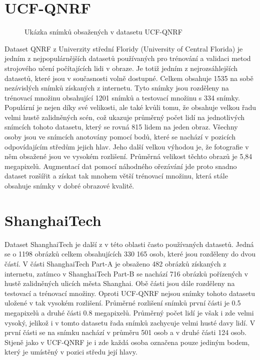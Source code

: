 \section{UCF-QNRF}
\begin{figure}[h!]
	\centering
	\caption{Ukázka snímků obsažených v datasetu UCF-QNRF \cite{QNRF}}
	\label{fig:QNRF}
\end{figure}

Dataset QNRF \cite{QNRF} z Univerzity střední Floridy (University of Central Florida) je jedním z nejpopulárnějších datasetů používaných pro trénování a validaci metod strojového učení počítajících lidi v obraze.
Je totiž jedním z nejrozsáhlejších datasetů, které jsou v současnosti volně dostupné.
Celkem obsahuje 1535 na sobě nezávislých snímků získaných z internetu.
Tyto snímky jsou rozděleny na trénovací množinu obsahující 1201 snímků a testovací množinu s 334 snímky.
Populární je nejen díky své velikosti, ale také kvůli tomu, že obsahuje velkou řadu velmi hustě zalidněných scén, což ukazuje průměrný počet lidí na jednotlivých snímcích tohoto datasetu, který se rovná 815 lidem na jeden obraz.
Všechny osoby jsou ve snímcích anotovány pomocí bodů, které se nachází v pozicích odpovídajícím středům jejich hlav.
Jeho další velkou výhodou je, že fotografie v něm obsažené jsou ve vysokém rozlišení.
Průměrná velikost těchto obrazů je 5,84 megapixelů.
Augmentací dat pomocí náhodného ořezávání jde proto snadno dataset rozšířit a získat tak mnohem větší trénovací množinu, která stále obsahuje snímky v dobré obrazové kvalitě.


\section{ShanghaiTech}
Dataset ShanghaiTech \cite{ShanghaiTech} je další z v této oblasti často používaných datasetů.
Jedná se o 1198 obrázků celkem obsahujících 330 165 osob, které jsou rozděleny do dvou částí.
V části ShanghaiTech Part-A je obsaženo 482 obrázků získaných z internetu, zatímco v ShanghaiTech Part-B se nachází 716 obrázků pořízených v hustě zalidněných ulicích města Shanghai. Obě části jsou dále rozděleny na testovací a trénovací množiny.
Oproti UCF-QNRF nejsou snímky tohoto datasetu uložené v tak vysokém rozlišení. Průměrné rozlišení snímků první části je 0.5 megapixelů a druhé části 0.8 megapixelů.
Průměrný počet lidí je však i zde velmi vysoký, jelikož i v tomto datasetu řada snímků zachycuje velmi husté davy lidí. V první části se na snímku nachází v průměru 501 osob a v druhé části 124 osob.
Stjeně jako v UCF-QNRF je i zde každá osoba označena pouze jediným bodem, který je umístěný v pozici středu její hlavy.


